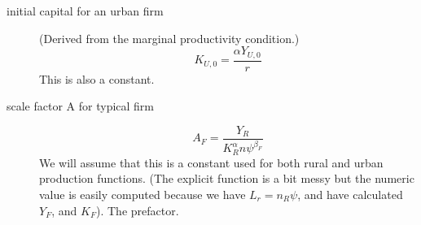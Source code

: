 \begin{description}
\item[initial capital for an urban firm] (Derived from the marginal productivity condition.)
\[K_{U,0}=  \frac{\alpha Y_{U,0} }{r}\]
This is also a constant.

\item[scale factor A for typical  firm] 
\[A_F= \frac{Y_R}{K_R^{\alpha} {n\psi}^{\beta_F}}\]
We will assume that this is a constant used for both rural and urban production functions. (The explicit function is a bit  messy but the numeric value is easily computed because we have $L_r=n_R\psi$, and have calculated $Y_F$, and  $K_F$). The prefactor.

\end{description}

